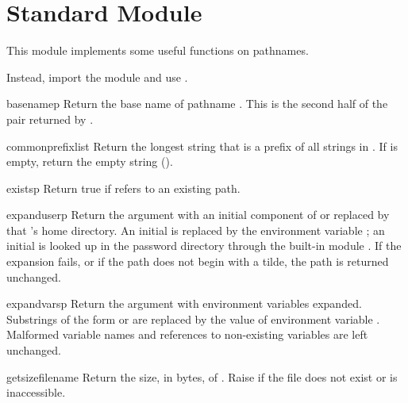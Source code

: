 \section{Standard Module }


This module implements some useful functions on \POSIX{} pathnames.

  Instead, import the
module  and use .


\begin{funcdesc}{basename}{p}
Return the base name of pathname
.
This is the second half of the pair returned by
.
\end{funcdesc}

\begin{funcdesc}{commonprefix}{list}
Return the longest string that is a prefix of all strings in
.
If
is empty, return the empty string ().
\end{funcdesc}

\begin{funcdesc}{exists}{p}
Return true if
refers to an existing path.
\end{funcdesc}

\begin{funcdesc}{expanduser}{p}
Return the argument with an initial component of \samp{\~} or
 replaced by that 's home directory.  An
initial \samp{\~{}} is replaced by the environment variable
; an initial  is looked up in the
password directory through the built-in module
.  If the expansion fails, or if the
path does not begin with a tilde, the path is returned unchanged.
\end{funcdesc}

\begin{funcdesc}{expandvars}{p}
Return the argument with environment variables expanded.  Substrings
of the form  or  are
replaced by the value of environment variable .  Malformed
variable names and references to non-existing variables are left
unchanged.
\end{funcdesc}

\begin{funcdesc}{getsize}{filename}
Return the size, in bytes, of .  Raise
 if the file does not exist or is inaccessible.
\end{funcdesc}

